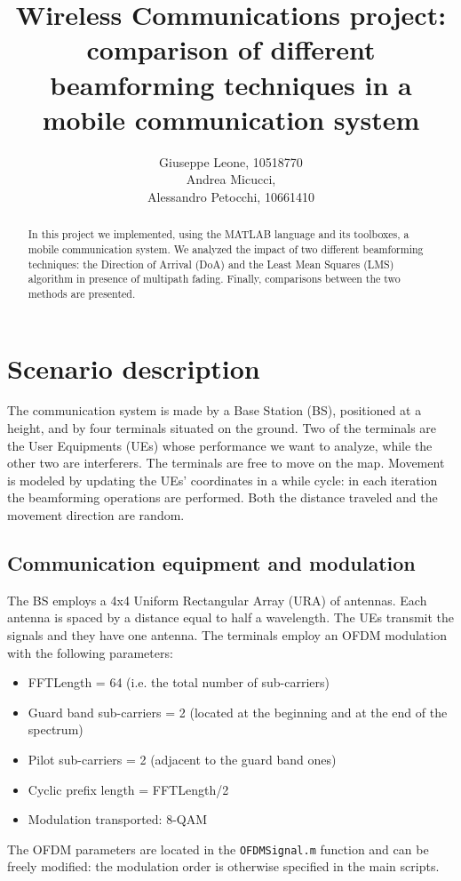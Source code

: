 \documentclass[a4paper,10pt]{article}
\title{Wireless Communications project: comparison of different beamforming techniques in a mobile communication system}
\author{Giuseppe Leone, 10518770 \\ Andrea Micucci, \\ Alessandro Petocchi, 10661410}
\begin{document}
\maketitle
\begin{abstract}
In this project we implemented, using the MATLAB language and its toolboxes, a mobile communication system. We analyzed the impact of two different beamforming techniques: the Direction of Arrival (DoA) and the Least Mean Squares (LMS) algorithm in presence of multipath fading. Finally, comparisons between the two methods are presented.
\end{abstract}
\section{Scenario description}
The communication system is made by a Base Station (BS), positioned at a height, and by four terminals situated on the ground. Two of the terminals are the User Equipments (UEs) whose performance we want to analyze, while the other two are interferers. 
The terminals are free to move on the map. Movement is modeled by updating the UEs' coordinates in a while cycle: in each iteration the beamforming operations are performed. Both the distance traveled and the movement direction are random.
\subsection{Communication equipment and modulation}
The BS employs a 4x4 Uniform Rectangular Array (URA) of antennas. Each antenna is spaced by a distance equal to half a wavelength. The UEs transmit the signals and they have one antenna. The terminals employ an OFDM modulation with the following parameters:
\begin{itemize}
	\item FFTLength = 64 (i.e. the total number of sub-carriers)
	\item Guard band sub-carriers = 2 (located at the beginning and at the end of the spectrum)
	\item Pilot sub-carriers = 2 (adjacent to the guard band ones)
	\item Cyclic prefix length = FFTLength/2
	\item Modulation transported: 8-QAM
\end{itemize}
The OFDM parameters are located in the \texttt{OFDMSignal.m} function and can be freely modified: the modulation order is otherwise specified in the main scripts.
\end{document}
